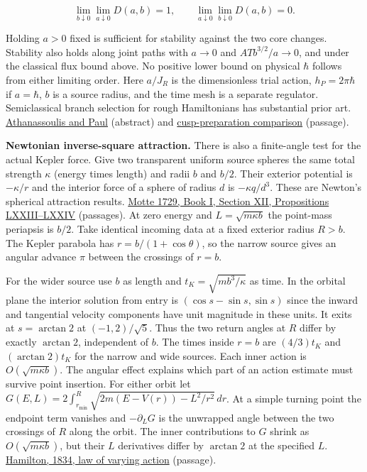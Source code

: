 \documentclass[11pt,a4paper]{article}
\begin{document}
\[
 \lim_{b\downarrow0}\lim_{a\downarrow0}D(a,b)=1,\qquad
 \lim_{a\downarrow0}\lim_{b\downarrow0}D(a,b)=0 .
\]

Holding \(a>0\) fixed is sufficient for stability against the two core
changes. Stability also holds along joint paths with \(a\to0\) and
\(AT b^{3/2}/a\to0\), and under the classical flux bound above. No
positive lower bound on physical \(\hbar\) follows from either limiting
order. Here \(a/J_R\) is the dimensionless trial action,
\(h_P=2\pi\hbar\) if \(a=\hbar\), \(b\) is a source radius, and the time
mesh is a separate regulator. Semiclassical branch selection for rough
Hamiltonians has substantial prior art.
\href{https://arxiv.org/abs/1011.1651}{Athanassoulis and Paul}
(abstract) and
\href{cusp-quantum-preparation-selection.md}{cusp-preparation
comparison} (passage).

\textbf{Newtonian inverse-square attraction.} There is also a
finite-angle test for the actual Kepler force. Give two transparent
uniform source spheres the same total strength \(\kappa\) (energy times
length) and radii \(b\) and \(b/2\). Their exterior potential is
\(-\kappa/r\) and the interior force of a sphere of radius \(d\) is
\(-\kappa q/d^3\). These are Newton's spherical attraction results.
\href{https://en.wikisource.org/wiki/The_Mathematical_Principles_of_Natural_Philosophy_\%281729\%29/Book_1/Section_12}{Motte
1729, Book I, Section XII, Propositions LXXIII--LXXIV} (passages). At
zero energy and \(L=\sqrt{m\kappa b}\) the point-mass periapsis is
\(b/2\). Take identical incoming data at a fixed exterior radius
\(R>b\). The Kepler parabola has \(r=b/(1+\cos\theta)\), so the narrow
source gives an angular advance \(\pi\) between the crossings of
\(r=b\).

For the wider source use \(b\) as length and \(t_K=\sqrt{mb^3/\kappa}\)
as time. In the orbital plane the interior solution from entry is
\((\cos s-\sin s,\sin s)\) since the inward and tangential velocity
components have unit magnitude in these units. It exits at
\(s=\arctan 2\) at \((-1,2)/\sqrt5\). Thus the two return angles at
\(R\) differ by exactly \(\arctan 2\), independent of \(b\). The times
inside \(r=b\) are \((4/3)t_K\) and \((\arctan 2)t_K\) for the narrow
and wide sources. Each inner action is \(O(\sqrt{m\kappa b})\). The
angular effect explains which part of an action estimate must survive
point insertion. For either orbit let
\(G(E,L)=2\int_{r_{\min}}^R\sqrt{2m(E-V(r))-L^2/r^2}\,dr\). At a simple
turning point the endpoint term vanishes and \(-\partial_L G\) is the
unwrapped angle between the two crossings of \(R\) along the orbit. The
inner contributions to \(G\) shrink as \(O(\sqrt{m\kappa b})\), but
their \(L\) derivatives differ by \(\arctan 2\) at the specified \(L\).
\href{../docs/classics/Hamilton_GeneralMethodDynamics_1834_Wilkins.md}{Hamilton,
1834, law of varying action} (passage).
\end{document}
